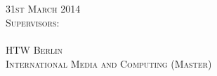 
\thispagestyle{empty}


\begin{center}

\vspace*{2cm}
\Large
\textsc{\reporttitle}\\

\vspace{3cm}

\reportauthor\\


\vspace{2.5cm}
\textsc{31st March 2014}\\

\vspace{1cm}
\textsc{Supervisors:\\
\firstsupervisor}\\

\vspace{0.5cm}
\textsc{HTW Berlin\\
International Media and Computing (Master)}

\end{center}

\addtocounter{page}{-1}